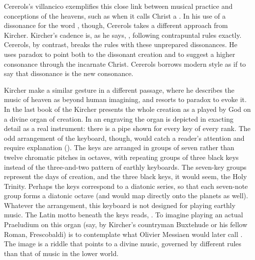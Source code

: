 
Cererols's villancico exemplifies this close link between musical practice and
conceptions of the heavens, such as when it calls Christ a .
In his use of a dissonance for the word , though, Cererols
takes a different approach from Kircher.
Kircher's cadence is, as he says, , following
contrapuntal rules exactly.
Cererols, by contrast, breaks the rules with these unprepared dissonances.
He uses paradox to point both to the dissonant creation and to suggest a higher
consonance through the incarnate Christ.
Cererols borrows modern style as if to say that dissonance is the new
consonance.

Kircher make a similar gesture in a different passage, where he describes the
music of heaven as beyond human imagining, and resorts to paradox to evoke it.
In the last book of the  Kircher presents the whole creation as
a  played by God on a divine organ of creation.%
    \Autocites
    [, facing 366]{Kircher:Musurgia}
    [177]{Godwin:KircherTheater}
In an engraving the organ is depicted in exacting detail as a real instrument:
there is a pipe shown for every key of every rank.
The odd arrangement of the keyboard, though, would catch a reader's attention
and require explanation ().
The keys are arranged in groups of seven rather than twelve chromatic pitches in
octaves, with repeating groups of three black keys instead of the three-and-two
pattern of earthly keyboards. 
The seven-key groups represent the days of creation, and the three black keys,
it would seem, the Holy Trinity. 
Perhaps the keys correspond to a diatonic series, so that each seven-note group
forms a diatonic octave (and would map directly onto the planets as well).
Whatever the arrangement, this keyboard is not designed for playing earthly
music.
The Latin motto beneath the keys reads, .
To imagine playing an actual Praeludium on this organ (say, by Kircher's
countryman Buxtehude or his fellow Roman, Frescobaldi) is to contemplate what
Olivier Messiaen would later call .%
    \Autocite{Messiaen:Technique}
The image is a riddle that points to a divine music, governed by different rules
than that of music in the lower world.


